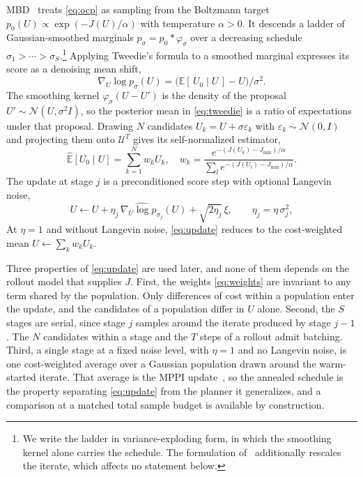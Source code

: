 \documentclass[letterpaper,10pt,conference]{ieeeconf}
\begin{document}
MBD~\cite{pan2024model} treats \eqref{eq:ocp} as sampling from the Boltzmann target $p_0(U) \propto \exp(-J(U)/\alpha)$ with temperature $\alpha > 0$.
It descends a ladder of Gaussian-smoothed marginals $p_{\sigma} = p_0 * \varphi_{\sigma}$ over a decreasing schedule $\sigma_1 > \cdots > \sigma_S$.\footnote{We write the ladder in variance-exploding form, in which the smoothing kernel alone carries the schedule. The formulation of~\cite{pan2024model} additionally rescales the iterate, which affects no statement below.}
Applying Tweedie's formula to a smoothed marginal expresses its score as a denoising mean shift,
\begin{equation}
\nabla_U \log p_{\sigma}(U) = \big(\mathbb{E}[\,U_0 \mid U\,] - U\big)\big/\sigma^{2} .
\label{eq:tweedie}
\end{equation}
The smoothing kernel $\varphi_\sigma(U - U')$ is the density of the proposal $U' \sim \mathcal{N}(U, \sigma^2 I)$, so the posterior mean in \eqref{eq:tweedie} is a ratio of expectations under that proposal.
Drawing $N$ candidates $U_k = U + \sigma \varepsilon_k$ with $\varepsilon_k \sim \mathcal{N}(0,I)$ and projecting them onto $\mathcal{U}^{T}$ gives its self-normalized estimator,
\begin{equation}
\widehat{\mathbb{E}}[U_0 \mid U] = \sum_{k=1}^{N} w_k U_k,
\quad
w_k = \frac{e^{-(J(U_k) - J_{\min})/\alpha}}{\sum_{l} e^{-(J(U_l) - J_{\min})/\alpha}} .
\label{eq:weights}
\end{equation}
The update at stage $j$ is a preconditioned score step with optional Langevin noise,
\begin{equation}
U \leftarrow U + \eta_j\, \widehat{\nabla_U \log p_{\sigma_j}}(U) + \sqrt{2 \eta_j}\, \xi,
\qquad \eta_j = \eta\, \sigma_j^{2},
\label{eq:update}
\end{equation}
At $\eta = 1$ and without Langevin noise, \eqref{eq:update} reduces to the cost-weighted mean $U \leftarrow \sum_k w_k U_k$.

Three properties of \eqref{eq:update} are used later, and none of them depends on the rollout model that supplies $J$.
First, the weights \eqref{eq:weights} are invariant to any term shared by the population.
Only differences of cost within a population enter the update, and the candidates of a population differ in $U$ alone.
Second, the $S$ stages are serial, since stage $j$ samples around the iterate produced by stage $j-1$.
The $N$ candidates within a stage and the $T$ steps of a rollout admit batching.
Third, a single stage at a fixed noise level, with $\eta = 1$ and no Langevin noise, is one cost-weighted average over a Gaussian population drawn around the warm-started iterate.
That average is the MPPI update~\cite{williams2017mppi}, so the annealed schedule is the property separating \eqref{eq:update} from the planner it generalizes, and a comparison at a matched total sample budget is available by construction.
\end{document}
